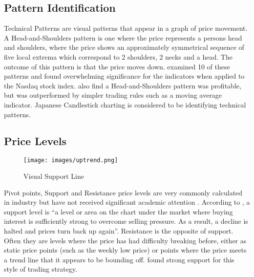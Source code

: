 \documentclass[12pt, oneside, a4paper]{article}
\theoremstyle{definition}
\begin{document}
\begin{appendices}
\subsection{Pattern Identification}
Technical Patterns are visual patterns that appear in a graph of price movement. A Head-and-Shoulders pattern is one where the price represents a persons head and shoulders, where the price shows an approximately symmetrical sequence of five local extrema which correspond to 2 shoulders, 2 necks and a head. The outcome of this pattern is that the price moves down. \cite{foundations} examined 10 of these patterns and found overwhelming significance for the indicators when applied to the Nasdaq stock index. \cite{chang1999methodical} also find a Head-and-Shoulders pattern was profitable, but was outperformed by simpler trading rules such as a moving average indicator. Japanese Candlestick charting is considered to be identifying technical patterns.

\subsection{Price Levels}

\begin{figure}[H]
    \centering
    \caption{Visual Support Line}
    \texttt{[image: images/uptrend.png]}
\end{figure}

Pivot points, Support and Resistance price levels are very commonly calculated in industry but have not received significant academic attention \citep[p.~55]{osler2000support}. According to \cite{murphy1999technical}, a support level is ``a level or area on the chart under the market where buying interest is sufficiently strong to overcome selling pressure. As a result, a decline is halted and prices turn back up again''. Resistance is the opposite of support. Often they are levels where the price has had difficulty breaking before, either as static price points (such as the weekly low price) or points where the price meets a trend line that it appears to be bounding off. \cite{brock1992} found strong support for this style of trading strategy.
\end{appendices}
\end{document}
